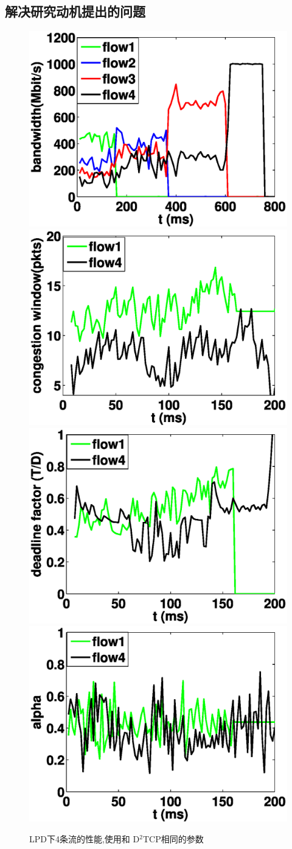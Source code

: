\subsection{解决研究动机提出的问题}

\begin{figure}[h]
  \centering%
    {\includegraphics[width=0.5\columnwidth]{figures/LPD/evaluation_1/LPD_bandwidth2.eps}}%
      {\includegraphics[width=0.5\columnwidth]{figures/LPD/evaluation_1/LPD_window2.eps}}
    {\includegraphics[width=0.5\columnwidth]{figures/LPD/evaluation_1/LPD_factor2.eps}}%
      {\includegraphics[width=0.5\columnwidth]{figures/LPD/evaluation_1/LPD_alpha2.eps}}
  \caption{LPD下4条流的性能,使用和 D$^{2}$TCP相同的参数}
  \label{evalution_cases_principle_fig}
\end{figure}


